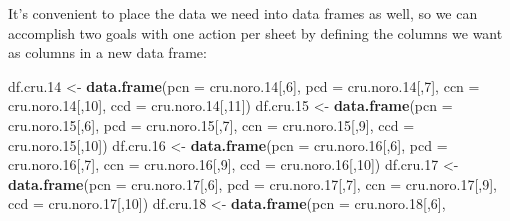 \documentclass[
  11,
]{book}
\newenvironment{Shaded}{\begin{snugshade}}{\end{snugshade}}
\newcommand{\AttributeTok}[1]{\textcolor[rgb]{0.27,0.27,0.27}{#1}}
\newcommand{\DecValTok}[1]{\textcolor[rgb]{0.06,0.06,0.06}{#1}}
\newcommand{\FloatTok}[1]{\textcolor[rgb]{0.06,0.06,0.06}{#1}}
\newcommand{\FunctionTok}[1]{\textcolor[rgb]{0.27,0.27,0.27}{\textbf{#1}}}
\newcommand{\NormalTok}[1]{#1}
\newcommand{\OtherTok}[1]{\textcolor[rgb]{0.37,0.37,0.37}{#1}}
\begin{document}
It's convenient to place the data we need into data frames as well, so we can accomplish two goals with one action per sheet by defining the columns we want as columns in a new data frame:

\begin{Shaded}
\begin{Highlighting}[]
\NormalTok{df.cru}\FloatTok{.14} \OtherTok{\textless{}{-}} \FunctionTok{data.frame}\NormalTok{(}\AttributeTok{pcn =}\NormalTok{ cru.noro}\FloatTok{.14}\NormalTok{[,}\DecValTok{6}\NormalTok{],}
                        \AttributeTok{pcd =}\NormalTok{ cru.noro}\FloatTok{.14}\NormalTok{[,}\DecValTok{7}\NormalTok{],}
                        \AttributeTok{ccn =}\NormalTok{ cru.noro}\FloatTok{.14}\NormalTok{[,}\DecValTok{10}\NormalTok{],}
                        \AttributeTok{ccd =}\NormalTok{ cru.noro}\FloatTok{.14}\NormalTok{[,}\DecValTok{11}\NormalTok{])}
\NormalTok{df.cru}\FloatTok{.15} \OtherTok{\textless{}{-}} \FunctionTok{data.frame}\NormalTok{(}\AttributeTok{pcn =}\NormalTok{ cru.noro}\FloatTok{.15}\NormalTok{[,}\DecValTok{6}\NormalTok{],}
                          \AttributeTok{pcd =}\NormalTok{ cru.noro}\FloatTok{.15}\NormalTok{[,}\DecValTok{7}\NormalTok{],}
                          \AttributeTok{ccn =}\NormalTok{ cru.noro}\FloatTok{.15}\NormalTok{[,}\DecValTok{9}\NormalTok{],}
                          \AttributeTok{ccd =}\NormalTok{ cru.noro}\FloatTok{.15}\NormalTok{[,}\DecValTok{10}\NormalTok{])}
\NormalTok{df.cru}\FloatTok{.16} \OtherTok{\textless{}{-}} \FunctionTok{data.frame}\NormalTok{(}\AttributeTok{pcn =}\NormalTok{ cru.noro}\FloatTok{.16}\NormalTok{[,}\DecValTok{6}\NormalTok{],}
                        \AttributeTok{pcd =}\NormalTok{ cru.noro}\FloatTok{.16}\NormalTok{[,}\DecValTok{7}\NormalTok{],}
                        \AttributeTok{ccn =}\NormalTok{ cru.noro}\FloatTok{.16}\NormalTok{[,}\DecValTok{9}\NormalTok{],}
                        \AttributeTok{ccd =}\NormalTok{ cru.noro}\FloatTok{.16}\NormalTok{[,}\DecValTok{10}\NormalTok{])}
\NormalTok{df.cru}\FloatTok{.17} \OtherTok{\textless{}{-}} \FunctionTok{data.frame}\NormalTok{(}\AttributeTok{pcn =}\NormalTok{ cru.noro}\FloatTok{.17}\NormalTok{[,}\DecValTok{6}\NormalTok{],}
                        \AttributeTok{pcd =}\NormalTok{ cru.noro}\FloatTok{.17}\NormalTok{[,}\DecValTok{7}\NormalTok{],}
                        \AttributeTok{ccn =}\NormalTok{ cru.noro}\FloatTok{.17}\NormalTok{[,}\DecValTok{9}\NormalTok{],}
                        \AttributeTok{ccd =}\NormalTok{ cru.noro}\FloatTok{.17}\NormalTok{[,}\DecValTok{10}\NormalTok{])}
\NormalTok{df.cru}\FloatTok{.18} \OtherTok{\textless{}{-}} \FunctionTok{data.frame}\NormalTok{(}\AttributeTok{pcn =}\NormalTok{ cru.noro}\FloatTok{.18}\NormalTok{[,}\DecValTok{6}\NormalTok{],}

\end{Highlighting}
\end{Shaded}
\end{document}
